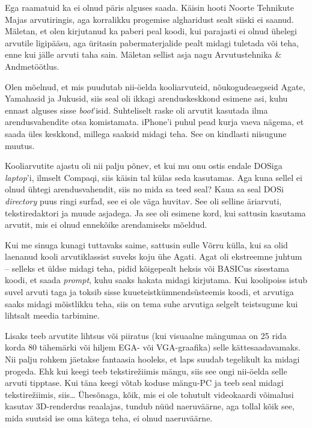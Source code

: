 Ega raamatuid ka ei olnud päris alguses saada. Käisin hooti
Noorte Tehnikute Majas 
arvutiringis, aga korralikku progemise algharidust sealt siiski ei saanud. Mäletan, et 
olen kirjutanud ka paberi peal koodi, kui parajasti 
ei olnud ühelegi arvutile ligipääsu, aga üritasin pabermaterjalide pealt 
midagi tuletada või teha, enne kui jälle arvuti taha sain. Mäletan sellist asja nagu
Arvutustehnika \& Andmetöötlus. 


Olen mõelnud, et mis puudutab 
nii-öelda kooliarvuteid, nõukogudeaegseid Agate, 
Yamahasid ja Jukusid, siis seal oli 
ikkagi arenduskeskkond esimene asi, kuhu ennast alguses sisse 
\emph{boot}'isid. Suhteliselt raske oli arvutit kasutada ilma
arendusvahendite otsa komistamata. iPhone'i puhul pead kurja 
vaeva nägema, et saada üles keskkond, millega saaksid midagi teha. See 
on kindlasti niisugune muutus. 

Kooliarvutite ajastu oli nii 
palju põnev, et kui mu onu ostis endale DOSiga \emph{laptop}'i, ilmselt Compaqi, siis käisin tal külas seda kasutamas. Aga kuna sellel ei olnud ühtegi arendusvahendit, siis no mida sa 
teed seal? Kaua sa seal DOSi \emph{directory} puus ringi surfad, see ei ole väga huvitav. See oli selline äriarvuti, tekstiredaktori ja muude asjadega. Ja see oli
esimene kord, kui 
sattusin kasutama arvutit, mis ei olnud ennekõike arendamiseks mõeldud. 

Kui me sinuga kunagi tuttavaks saime, sattusin sulle Võrru 
külla, kui sa olid laenanud kooli arvutiklassist suveks koju ühe 
Agati. Agat oli ekstreemne juhtum -- selleks et üldse midagi teha, pidid kõigepealt heksis või BASICus 
sisestama koodi, et saada \emph{prompt}, kuhu saaks hakata midagi 
kirjutama. Kui koolipoiss istub suvel arvuti taga ja toksib sisse 
kuueteistkümnendsüsteemis koodi, et arvutiga saaks midagi 
mõistlikku teha, siis on tema suhe arvutiga selgelt teistsugune kui 
lihtsalt meedia tarbimine. 

Lisaks teeb arvutite lihtsus või piiratus (kui 
visuaalne mängumaa on 25 rida korda 80 tähemärki või hiljem EGA- või 
VGA-graafika) selle kättesaadavamaks. Nii palju rohkem jäetakse 
fantaasia hooleks, et laps suudab tegelikult ka midagi progeda. Ehk kui keegi 
teeb tekstirežiimis mängu, siis see ongi nii-öelda selle arvuti tipptase. 
Kui täna keegi võtab koduse mängu-PC ja teeb seal midagi 
tekstirežiimis, siis\ldots{ }Ühesõnaga, kõik, mis ei ole tohutult videokaardi 
võimalusi kasutav 3D-renderdus reaalajas, tundub nüüd naeruväärne, aga tollal 
kõik see, mida suutsid ise oma kätega teha, ei olnud naeruväärne. 

